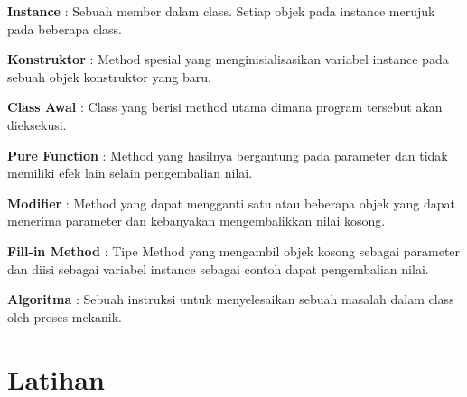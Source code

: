 \textbullet \textbf{Instance} : Sebuah member dalam class. Setiap objek pada instance merujuk pada beberapa class. \newline

\textbullet \textbf{Konstruktor} : Method spesial yang menginisialisasikan variabel instance pada sebuah objek konstruktor yang baru. \newline

\textbullet \textbf{Class Awal} : Class yang berisi method utama dimana program tersebut akan dieksekusi. \newline

\textbullet \textbf{Pure Function} : Method yang hasilnya bergantung pada parameter dan tidak memiliki efek lain selain pengembalian nilai. \newline

\textbullet \textbf{Modifier} : Method yang dapat mengganti satu atau beberapa objek yang dapat menerima parameter dan kebanyakan mengembalikkan nilai kosong. \newline

\textbullet \textbf{Fill-in Method} : Tipe Method yang mengambil objek kosong sebagai parameter dan diisi sebagai variabel instance sebagai contoh dapat pengembalian nilai. \newline

\textbullet \textbf{Algoritma} : Sebuah instruksi untuk menyelesaikan sebuah masalah dalam class oleh proses mekanik. \newline


\section{Latihan}

